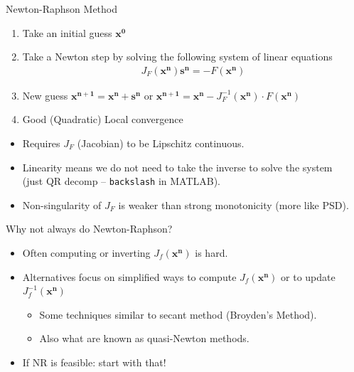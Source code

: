 \documentclass[aspectratio=169,11pt]{beamer}
\begin{document}
\begin{frame}{Newton-Raphson Method}
\begin{enumerate}
\item Take an initial guess $\symbf{x^0}$
\item Take a Newton step by solving the following system of linear equations
\begin{eqnarray*}
J_F(\symbf{x^n}) \symbf{s^n} = - F(\symbf{x^n})
\end{eqnarray*}
\item New guess $\symbf{x^{n+1}} =\symbf{x^n} + \symbf{s^n}$ or  $\symbf{x^{n+1}} =\symbf{x^n} - J_F^{-1}(\symbf{x^n})\cdot F(\symbf{x^n}) $ 
\item Good (Quadratic) Local convergence
\end{enumerate}
\begin{itemize}
\item Requires $J_F$ (Jacobian) to be Lipschitz continuous. 
\item Linearity means we do not need to take the inverse to solve the system\\
 (just QR decomp -- \texttt{backslash} in MATLAB).
\item Non-singularity of $J_F$ is weaker than strong monotonicity (more like PSD).
\end{itemize}
\end{frame} 

\begin{frame}{Why not always do Newton-Raphson?}
\begin{itemize}
\item Often computing or inverting $J_f(\symbf{x^n})$ is hard.
\item Alternatives focus on simplified ways to compute $J_f(\symbf{x^n})$ or to update $J_f^{-1}(\symbf{x^n})$
\begin{itemize}
\item Some techniques similar to \alert{secant method} (Broyden's Method).
\item Also what are known as \alert{quasi-Newton} methods.
\end{itemize}
\item If NR is feasible: start with that!
\end{itemize}
\end{frame} 
\end{document}

